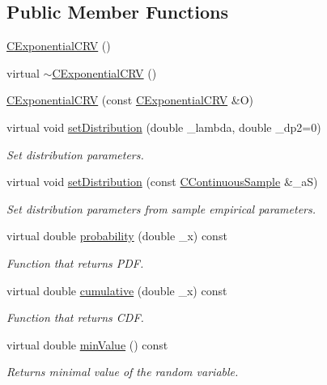 \subsection*{Public Member Functions}
\begin{DoxyCompactItemize}
\item 
\hyperlink{class_c_exponential_c_r_v_ad31de50d93048a267d9de9dd9c765420}{C\-Exponential\-C\-R\-V} ()
\item 
virtual \hyperlink{class_c_exponential_c_r_v_ac04305397299cc8ff2ac25569af53d7e}{$\sim$\-C\-Exponential\-C\-R\-V} ()
\item 
\hyperlink{class_c_exponential_c_r_v_a33b8b0ca18ae84971af2e3aa1d0e8adf}{C\-Exponential\-C\-R\-V} (const \hyperlink{class_c_exponential_c_r_v}{C\-Exponential\-C\-R\-V} \&O)
\item 
virtual void \hyperlink{class_c_exponential_c_r_v_aeb20b2f186539ebb81dbacfae6ae5547}{set\-Distribution} (double \-\_\-lambda, double \-\_\-dp2=0)
\begin{DoxyCompactList}\small\item\em Set distribution parameters. \end{DoxyCompactList}\item 
virtual void \hyperlink{class_c_exponential_c_r_v_aae94d39cf10bce746cfa3d9541c87fc2}{set\-Distribution} (const \hyperlink{class_c_continuous_sample}{C\-Continuous\-Sample} \&\-\_\-a\-S)
\begin{DoxyCompactList}\small\item\em Set distribution parameters from sample empirical parameters. \end{DoxyCompactList}\item 
virtual double \hyperlink{class_c_exponential_c_r_v_ae4560afbed461589cfcef9bfbd9f28ee}{probability} (double \-\_\-x) const 
\begin{DoxyCompactList}\small\item\em Function that returns P\-D\-F. \end{DoxyCompactList}\item 
virtual double \hyperlink{class_c_exponential_c_r_v_acc162a5d08bb9a89bb01a0ed06558073}{cumulative} (double \-\_\-x) const 
\begin{DoxyCompactList}\small\item\em Function that returns C\-D\-F. \end{DoxyCompactList}\item 
virtual double \hyperlink{class_c_exponential_c_r_v_a6b77e823ae4b0f183edf3400fe0d799d}{min\-Value} () const 
\begin{DoxyCompactList}\small\item\em Returns minimal value of the random variable. \end{DoxyCompactList}\item 

\end{DoxyCompactItemize}
